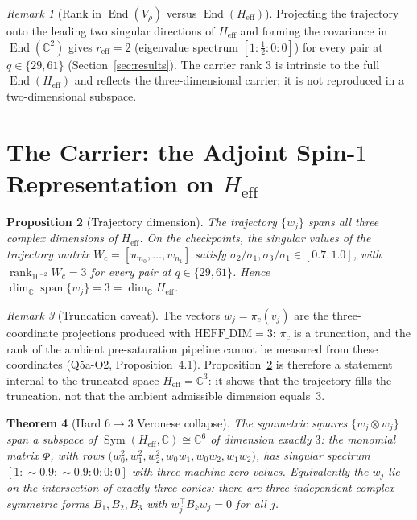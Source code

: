 \documentclass[12pt,a4paper]{article}
\newtheorem{theorem}{Theorem}[section]
\newtheorem{proposition}[theorem]{Proposition}
\theoremstyle{remark}
\newtheorem{remark}[theorem]{Remark}
\DeclareMathOperator{\rank}{rank}
\DeclareMathOperator{\Sym}{Sym}
\DeclareMathOperator{\End}{End}
\DeclareMathOperator{\Span}{span}
\newcommand{\Heff}{H_{\mathrm{eff}}}
\newcommand{\Vrho}{V_{\rho}}
\newcommand{\reff}{r_{\mathrm{eff}}}
\begin{document}
    \begin{remark}[Rank in $\End(\Vrho)$ versus $\End(\Heff)$]
      \label{rem:restriction}
      Projecting the trajectory onto the leading two singular directions of $\Heff$ and forming the covariance in
      $\End(\mathbb{C}^2)$ gives $\reff = 2$ (eigenvalue spectrum $[1 : \tfrac{1}{2} : 0 : 0]$) for every pair at
      $q \in \{29, 61\}$ (Section~\ref{sec:results}).
      The carrier rank $3$ is intrinsic to the full $\End(\Heff)$ and reflects the three-dimensional carrier; it is
      not reproduced in a two-dimensional subspace.
    \end{remark}

  \section{The Carrier: the Adjoint Spin-$1$ Representation on $\Heff$}
    \label{sec:vrho}

    \begin{proposition}[Trajectory dimension]
      \label{prop:dim}
      The trajectory $\{w_j\}$ spans all three complex dimensions of $\Heff$.
      On the checkpoints, the singular values of the trajectory matrix $W_c = [w_{n_0}, \ldots, w_{n_1}]$ satisfy
      $\sigma_2/\sigma_1, \sigma_3/\sigma_1 \in [0.7, 1.0]$, with $\rank_{10^{-2}} W_c = 3$ for every pair at
      $q \in \{29, 61\}$.
      Hence $\dim_{\mathbb{C}}\Span\{w_j\} = 3 = \dim_{\mathbb{C}}\Heff$.
    \end{proposition}

    \begin{remark}[Truncation caveat]
      \label{rem:truncation}
      The vectors $w_j = \pi_c(v_j)$ are the three-coordinate projections produced with
      $\mathrm{HEFF\_DIM} = 3$: $\pi_c$ is a truncation, and the rank of the ambient
      pre-saturation pipeline cannot be measured from these coordinates
      (Q5a-O2, Proposition~4.1).
      Proposition~\ref{prop:dim} is therefore a statement internal to the truncated space
      $\Heff = \mathbb{C}^3$: it shows that the trajectory fills the truncation, not that the
      ambient admissible dimension equals~$3$.
    \end{remark}

    \begin{theorem}[Hard $6 \to 3$ Veronese collapse]
      \label{thm:veronese}
      The symmetric squares $\{w_j \otimes w_j\}$ span a subspace of $\Sym(\Heff, \mathbb{C}) \cong \mathbb{C}^6$ of
      dimension exactly $3$: the monomial matrix
      $\Phi$, with rows $\bigl(w_0^2, w_1^2, w_2^2, w_0 w_1, w_0 w_2, w_1 w_2\bigr)$, has singular spectrum
      $[1 : {\sim}0.9 : {\sim}0.9 : 0 : 0 : 0]$ with three machine-zero values.
      Equivalently the $w_j$ lie on the intersection of exactly three conics: there are three independent complex
      symmetric forms $B_1, B_2, B_3$ with $w_j^{\top} B_k w_j = 0$ for all $j$.
    \end{theorem}
\end{document}
